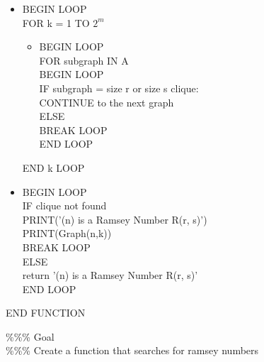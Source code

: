 \documentclass{Assignment}
\begin{document}
\begin{itemize}
\begin{itemize}
\item BEGIN LOOP\\
\hspace*{1cm}FOR k = 1 TO $2^{m}$\\
\begin{itemize}
	\item \hspace*{1.5cm}BEGIN LOOP\\
\hspace*{1.5cm} FOR subgraph IN A\\
\hspace*{1.5cm} BEGIN LOOP\\
\hspace*{1.5cm} IF subgraph = size r or size s clique:\\
\hspace*{2cm}CONTINUE to the next graph\\
\hspace*{1.5cm}ELSE \\
\hspace*{2cm}BREAK LOOP\\
\hspace*{1.5cm} END LOOP\\

\end{itemize}
\hspace*{1cm} END k LOOP
\item BEGIN LOOP\\
\hspace*{1cm}IF clique not found\\
\hspace*{1.5cm} PRINT('(n) is a Ramsey Number R(r, s)')\\
\hspace*{1.5cm} PRINT(Graph(n,k))\\
\hspace*{1.5cm} BREAK LOOP\\
\hspace*{1cm}ELSE \\
\hspace*{1.5cm} return '(n) is a Ramsey Number R(r, s)'\\
 END LOOP\\
\end{itemize}
END FUNCTION
\end{itemize}
\newpage
\%\%\% Goal\\
\%\%\% Create a function that searches for ramsey numbers \\
\end{document}

